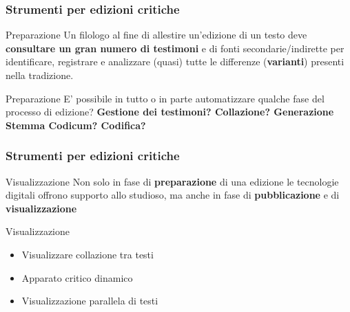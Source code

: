 \begin{frame}
	\frametitle{Strumenti per edizioni critiche}
	\addtocounter{nframe}{1}
    \begin{block}{Preparazione}
        Un filologo al fine di allestire un'edizione di un testo deve \textbf{consultare un gran numero di testimoni} e di fonti secondarie/indirette per identificare, registrare e analizzare (quasi) tutte le differenze (\textbf{varianti}) presenti nella tradizione.        
	\end{block}
	\begin{block}{Preparazione}
      E' possibile in tutto o in parte automatizzare qualche fase del processo di edizione? \textbf{Gestione dei testimoni? Collazione? Generazione Stemma Codicum? Codifica?}
	\end{block}
\end{frame}

\begin{frame}
    \frametitle{Strumenti per edizioni critiche}
    \addtocounter{nframe}{1}
    
    \begin{block}{Visualizzazione}
        Non solo in fase di \textbf{preparazione} di una edizione le tecnologie digitali offrono supporto allo studioso, ma anche in fase di \textbf{pubblicazione} e di \textbf{visualizzazione}
    \end{block}
    
    \begin{block}{Visualizzazione}
        \begin{itemize}
            \item Visualizzare collazione tra testi
            \item Apparato critico dinamico
            \item Visualizzazione parallela di testi
        \end{itemize}
    \end{block}

\end{frame}

